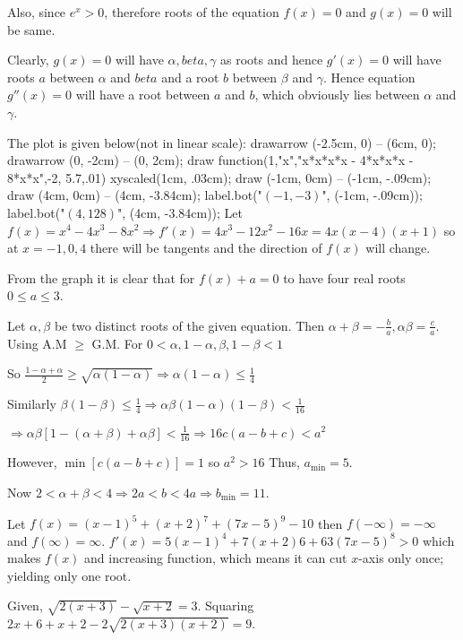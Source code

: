   Also, since $e^x > 0$, therefore roots of the equation $f(x) = 0$ and $g(x) = 0$ will be same.

  Clearly, $g(x) = 0$ will have $\alpha, beta, \gamma$ as roots and hence $g'(x) = 0$ will have roots $a$
  between $\alpha$ and $beta$ and a root $b$ between $\beta$ and $\gamma$. Hence equation $g''(x) = 0$ will
  have a root between $a$ and $b$, which obviously lies between $\alpha$ and $\gamma$.
\item The plot is given below(not in linear scale):
  \startplacefigure[location={middle,none}]
    \startMPcode
      drawarrow (-2.5cm, 0) -- (6cm, 0);
      drawarrow (0, -2cm) -- (0, 2cm);
      draw function(1,"x","x*x*x*x - 4*x*x*x - 8*x*x",-2, 5.7,.01) xyscaled(1cm, .03cm);
      draw (-1cm, 0cm) -- (-1cm, -.09cm);
      draw (4cm, 0cm) -- (4cm, -3.84cm);
      label.bot("$(-1, -3)$", (-1cm, -.09cm));
      label.bot("$(4, 128)$", (4cm, -3.84cm));
    \stopMPcode
  \stopplacefigure
  Let $f(x) = x^4 - 4x^3 - 8x^2 \Rightarrow f'(x) = 4x^3 - 12x^2 - 16x = 4x(x - 4)(x + 1)$ so at $x =
  -1, 0, 4$ there will be tangents and the direction of $f(x)$ will change.

  From the graph it is clear that for $f(x) + a = 0$ to have four real roots $0\leq a\leq 3$.
\item Let $\alpha, \beta$ be two distinct roots of the given equation. Then $\alpha + \beta = -\frac{b}{a},
  \alpha\beta = \frac{c}{a}$. Using A.M $\geq$ G.M. For $0 < \alpha, 1 - \alpha, \beta, 1 - \beta < 1$

  So $\frac{1 - \alpha + \alpha}{2}\geq\sqrt{\alpha(1 - \alpha)} \Rightarrow \alpha(1 - \alpha)\leq
  \frac{1}{4}$

  Similarly $\beta(1 - \beta)\leq \frac{1}{4}\Rightarrow \alpha\beta(1 - \alpha)(1 - \beta)< \frac{1}{16}$

  $\Rightarrow \alpha\beta[1 - (\alpha + \beta) + \alpha\beta] < \frac{1}{16}\Rightarrow 16c(a - b + c) <
  a^2$

  However, $\min[c(a - b + c)] = 1$ so $a^2 > 16$ Thus, $a_{\min} = 5$.

  Now $2 < \alpha + \beta < 4 \Rightarrow 2a < b < 4a \Rightarrow b_{\min} = 11$.
\item Let $f(x) = (x - 1)^5 + (x + 2)^7 + (7x - 5)^9 - 10$ then $f(-\infty) = -\infty$ and $f(\infty) =
  \infty$. $f'(x) = 5(x - 1)^4 + 7(x + 2)6 + 63(7x - 5)^8 > 0$ which makes $f(x)$ and increasing function,
  which means it can cut $x$-axis only once; yielding only one root.
\item Given, $\sqrt{2(x + 3)} - \sqrt{x + 2} = 3$. Squaring $2x + 6 + x + 2 - 2\sqrt{2(x + 3)(x + 2)} = 9$.

